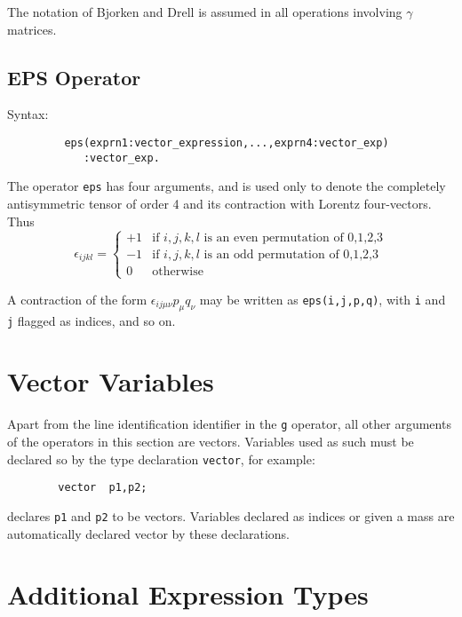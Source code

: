 The notation of Bjorken and Drell is assumed in all operations involving
$\gamma$ matrices.

\subsection{EPS Operator}
\hypertarget{operator:EPS}{}
Syntax:
\begin{verbatim}
         eps(exprn1:vector_expression,...,exprn4:vector_exp)
            :vector_exp.
\end{verbatim}
The operator \texttt{eps} has four arguments, and is used only to denote the
completely antisymmetric tensor of order 4 and its contraction with Lorentz
four-vectors. Thus
\[ \epsilon_{i j k l} = \left\{ \begin{array}{cl}
                                +1 & \mbox{if $i,j,k,l$ is an even permutation
                                              of 0,1,2,3} \\
                                -1 & \mbox{if $i,j,k,l$ is an odd permutation
                                              of 0,1,2,3} \\
                                0 & \mbox{otherwise}
                              \end{array}
                      \right. \]

A contraction of the form $\epsilon_{i j \mu \nu}p_{\mu}q_{\nu}$ may be
written as \texttt{eps(i,j,p,q)}, with \texttt{i} and \texttt{j} flagged as indices,
and so on.

\section{Vector Variables}
\hypertarget{command:VECTOR}{}

Apart from the line identification identifier in the \texttt{g} operator, all
other arguments of the operators in this section are vectors.  Variables
used as such must be declared so by the type declaration \texttt{vector},
 for example:
\begin{verbatim}
        vector  p1,p2;
\end{verbatim}
declares \texttt{p1} and \texttt{p2} to be vectors.  Variables declared as
indices or given a mass are automatically declared
vector by these declarations.

\section{Additional Expression Types}

